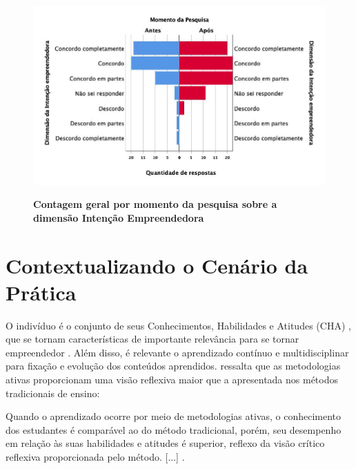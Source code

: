 \begin{figure}[H]
\centering
\caption{\textbf{Contagem geral por momento da pesquisa sobre a dimensão Intenção Empreendedora}}
\includegraphics[scale=0.4]{Imagens/dimensao_empreendedora.jpg}
\label{figura_45}
\end{figure}

\section{Contextualizando o Cenário da Prática}

O indivíduo é o conjunto de seus Conhecimentos, Habilidades e Atitudes (CHA) \cite{dutra_competencias_2004}, que se tornam características de importante relevância para se tornar empreendedor \cite{ferreira_conhecimento_2019}. Além disso, é relevante o aprendizado contínuo e multidisciplinar para fixação e evolução dos conteúdos aprendidos.  ressalta que as metodologias ativas proporcionam uma visão reflexiva maior que a apresentada nos métodos tradicionais de ensino:

\begin{citacao}
[...] Quando o aprendizado ocorre por meio de metodologias ativas, o conhecimento dos estudantes é comparável ao do método tradicional, porém, seu desempenho em relação às suas habilidades e atitudes é superior, reflexo da visão crítico reflexiva proporcionada pelo método. [...] \cite{limberger_metodologias_2013}.
\end{citacao}


